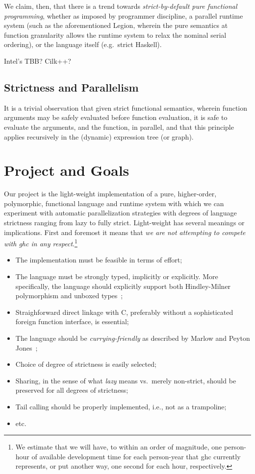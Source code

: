 \documentclass{llncs}
\begin{document}
We claim, then, that there is a trend towards \emph{strict-by-default pure
  functional programming}, whether as imposed by programmer discipline, a parallel
runtime system (such as the aforementioned Legion, wherein the pure semantics
at function granularity allows the runtime system to relax the nominal serial
ordering), or the language itself (e.g.\ strict Haskell).

Intel's TBB?  Cilk++?

\subsection{Strictness and Parallelism}

It is a trivial observation that given strict functional semantics, wherein
function arguments may be safely evaluated before function evaluation, it is
safe to evaluate the arguments, and the function, in parallel, and that this
principle applies recursively in the (dynamic) expression tree (or graph).

\section{Project and Goals}

Our project is the light-weight implementation of a pure, higher-order,
polymorphic, functional language and runtime system with which we can
experiment with automatic parallelization strategies with degrees of language
strictness ranging from lazy to fully strict.  Light-weight has several
meanings or implications.  First and foremost it means that \emph{we are not
  attempting to compete with ghc in any respect}.\footnote{We estimate that we
  will have, to within an order of magnitude, one person-hour of available
  development time for each person-year that ghc currently represents, or put
  another way, one second for each hour, respectively.}

\begin{itemize}
\item The implementation must be feasible in terms of effort;
\item The language must be strongly typed, implicitly or explicitly.  More
  specifically, the language should explicitly support both Hindley-Milner
  polymorphism and unboxed types~\cite{Jones:1991};
\item Straighforward direct linkage with C, preferably without a sophisticated
  foreign function interface, is essential;
\item The language should be \emph{currying-friendly} as described by Marlow
and Peyton Jones~\cite{Marlow2004};
\item Choice of degree of strictness is easily selected;
\item Sharing, in the sense of what \emph{lazy} means vs.\ merely non-strict,
  should be preserved for all degrees of strictness;
\item Tail calling should be properly implemented, i.e., not as a trampoline;
\item etc.
\end{itemize}
\end{document}
